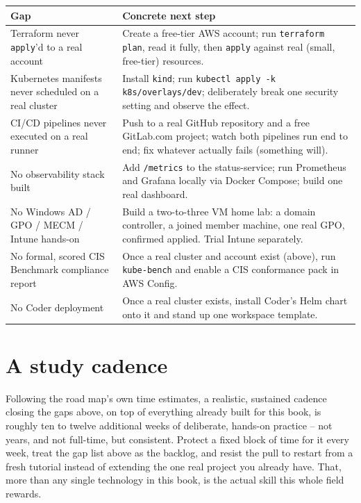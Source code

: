 \documentclass[11pt,twoside,openright]{book}
\begin{document}
\begin{longtable}{|p{}|p{}|}
\hline
\textbf{Gap} & \textbf{Concrete next step} \\
\hline
\endhead
Terraform never \texttt{apply}'d to a real account &
  Create a free-tier AWS account; run \texttt{terraform plan}, read it fully, then
  \texttt{apply} against real (small, free-tier) resources. \\
\hline
Kubernetes manifests never scheduled on a real cluster &
  Install \texttt{kind}; run \texttt{kubectl apply -k k8s/overlays/dev}; deliberately break
  one security setting and observe the effect. \\
\hline
CI/CD pipelines never executed on a real runner &
  Push to a real GitHub repository and a free GitLab.com project; watch both pipelines run
  end to end; fix whatever actually fails (something will). \\
\hline
No observability stack built &
  Add \texttt{/metrics} to the status-service; run Prometheus and Grafana locally via
  Docker Compose; build one real dashboard. \\
\hline
No Windows AD / GPO / MECM / Intune hands-on &
  Build a two-to-three VM home lab: a domain controller, a joined member machine, one real
  GPO, confirmed applied. Trial Intune separately. \\
\hline
No formal, scored CIS Benchmark compliance report &
  Once a real cluster and account exist (above), run \texttt{kube-bench} and enable a CIS
  conformance pack in AWS Config. \\
\hline
No Coder deployment &
  Once a real cluster exists, install Coder's Helm chart onto it and stand up one workspace
  template. \\
\hline
\end{longtable}

\section{A study cadence}

Following the road map's own time estimates, a realistic, sustained cadence closing the
gaps above, on top of everything already built for this book, is roughly ten to twelve
additional weeks of deliberate, hands-on practice -- not years, and not full-time,
but consistent. Protect a fixed block of time for it every week, treat the gap list above
as the backlog, and resist the pull to restart from a fresh tutorial instead of extending
the one real project you already have. That, more than any single technology in this book,
is the actual skill this whole field rewards.
\end{document}

